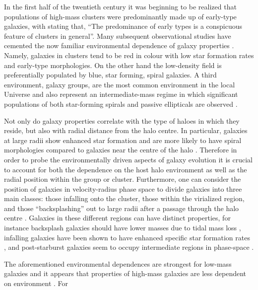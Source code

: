 \documentclass[a4paper,fleqn,usenatbib]{mnras}
\begin{document}
In the first half of the twentieth century it was beginning to be
realized that populations of high-mass clusters were predominantly
made up of early-type galaxies, with \citet{hubble1931} stating that,
``The predominance of early types is a conspicuous feature of clusters
in general''.  Many subsequent
observational studies have cemented the now
familiar environmental dependence of galaxy properties
\citep[e.g.][]{butcher1978, dressler1980, postman1984, dressler1999,
  blanton2005, wetzel2012}.  Namely, galaxies in clusters tend
to be red in colour with low star formation
rates and early-type morphologies.  On the other hand the
low-density field is preferentially populated by blue, star
forming, spiral galaxies.  A third environment, galaxy groups, are the
most common environment in
the local Universe \citep{geller1983, eke2005} and also represent an
intermediate-mass regime in which significant populations of both
star-forming spirals and passive ellipticals are observed
\citep[e.g.][]{wilman2005, mcgee2011}.
\par
Not only do galaxy properties correlate with the type of haloes in
which they reside, but also with radial distance from the halo centre.
In particular, galaxies at large radii show enhanced star
formation and are more likely to have spiral morphologies compared to
galaxies near the centre of the halo \citep{whitmore1993, goto2003,
  postman2005, rasmussen2012, wetzel2012, fasano2015, haines2015}.
Therefore in order to probe the environmentally driven aspects of
galaxy evolution it is crucial to account for both the dependence on
the host halo environment as well as the radial position within the
group or cluster.  Furthermore, one can consider the position
of galaxies in velocity-radius phase space to divide galaxies into
three main classes: those infalling onto the cluster, those within the
virialized region, and those
``backsplashing'' out to large radii after a passage through the halo
centre \citep[e.g.][]{mahajan2011}.  Galaxies in these different
regions can have distinct properties,
for instance backsplash galaxies should have lower masses due to tidal
mass loss \citep{gill2005}, infalling galaxies have been shown to have
enhanced specific star formation rates \citep{noble2016}, and
post-starburst galaxies seem to occupy intermediate regions in
phase-space \citep{muzzin2014}.
\par
The aforementioned environmental dependences are strongest for
low-mass galaxies and it appears that properties of high-mass galaxies
are less dependent on environment \citep{haines2006, bamford2009}.  For
\end{document}
